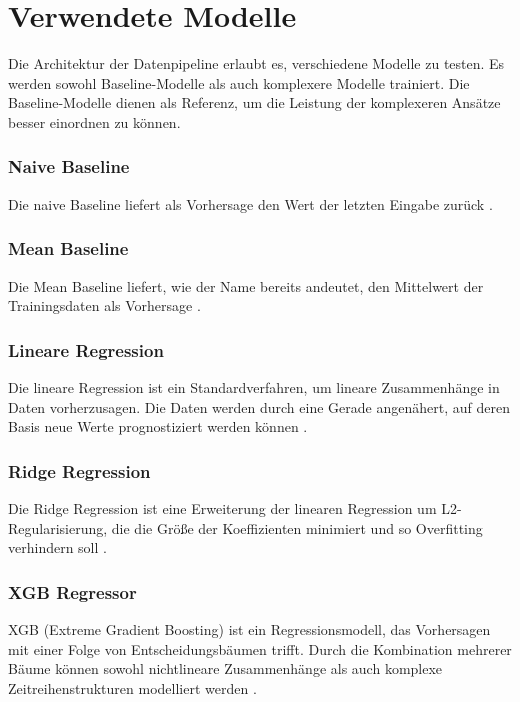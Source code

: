 \section{Verwendete Modelle}

Die Architektur der Datenpipeline erlaubt es, verschiedene Modelle zu testen.
Es werden sowohl Baseline-Modelle als auch komplexere Modelle trainiert.
Die Baseline-Modelle dienen als Referenz, um die Leistung der komplexeren Ansätze besser einordnen zu können.

\subsubsection{Naive Baseline}

Die naive Baseline liefert als Vorhersage den Wert der letzten Eingabe zurück \cite{Baseline2024}.

\subsubsection{Mean Baseline}

Die Mean Baseline liefert, wie der Name bereits andeutet, den Mittelwert der Trainingsdaten als Vorhersage \cite{Baseline2024}.

\subsubsection{Lineare Regression}

Die lineare Regression ist ein Standardverfahren, um lineare Zusammenhänge in Daten vorherzusagen.
Die Daten werden durch eine Gerade angenähert, auf deren Basis neue Werte prognostiziert werden können \cite{Linear2026}.

\subsubsection{Ridge Regression}

Die Ridge Regression ist eine Erweiterung der linearen Regression um L2-Regularisierung, die die Größe der Koeffizienten minimiert und so Overfitting verhindern soll \cite{Ridge2026}.


\subsubsection{XGB Regressor}

XGB (Extreme Gradient Boosting) ist ein Regressionsmodell, das Vorhersagen mit einer Folge von Entscheidungsbäumen trifft.
Durch die Kombination mehrerer Bäume können sowohl nichtlineare Zusammenhänge als auch komplexe Zeitreihenstrukturen modelliert werden \cite{XGBoost}.


